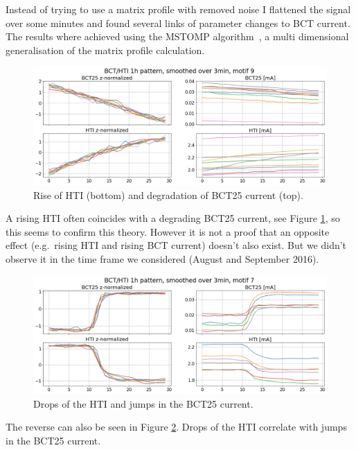 \documentclass[12pt,a4paper]{article}
\begin{document}
Instead of trying to use a matrix profile with removed noise I flattened the signal over some minutes and found several links of parameter changes to BCT current. The results where achieved using the MSTOMP algorithm~\cite{Yeh:MatrixProfileVI}, a multi dimensional
generalisation of the matrix profile calculation.

\begin{figure}
\centering
\includegraphics[width=!,totalheight=!,scale=0.4]{images/hti_bct_htirise.png}
\caption{Rise of HTI (bottom) and degradation of BCT25 current (top).}
\label{fig:hti_bct_htirise}
\end{figure}

A rising HTI often coincides with a degrading BCT25 current, see Figure \ref{fig:hti_bct_htirise}, so this seems to confirm this theory. However it is not a proof that an opposite effect (e.g.~rising HTI and rising BCT current) doesn't also exist. But we didn't observe it in the time frame we considered (August and September 2016).

\begin{figure}
\centering
\includegraphics[width=!,totalheight=!,scale=0.4]{images/hti_bct_htifall.png}
\caption{Drops of the HTI and jumps in the BCT25 current.}
\label{fig:hti_bct_htifall}
\end{figure}

The reverse can also be seen in Figure \ref{fig:hti_bct_htifall}. Drops of the HTI correlate with jumps in the BCT25 current.
\end{document}
